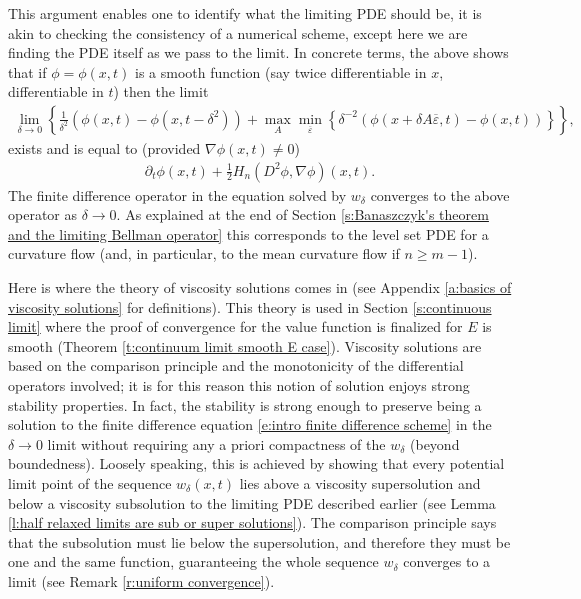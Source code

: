 \documentclass[reqno]{amsart}
\numberwithin{equation}{section}
\begin{document}
This argument enables one to identify what the limiting PDE should be, it is akin to checking the consistency of a numerical scheme, except here we are finding the PDE itself as we pass to the limit. In concrete terms, the above shows that if $\phi=\phi(x,t)$ is a smooth function (say twice differentiable in $x$, differentiable in $t$) then the limit
\begin{align*}
  \lim \limits_{\delta\to 0}\left \{ \tfrac{1}{\delta^2}(\phi(x,t)-\phi(x,t-\delta^2))+\max_A\min_{\overline \varepsilon}\left \{ \delta^{-2}(\phi(x+\delta A\overline\varepsilon,t)-\phi(x,t)) \right \} \right \},
\end{align*}
exists and is equal to (provided $\nabla \phi(x,t)\neq 0$)
\begin{align*}
  \partial_t \phi(x,t) + \tfrac{1}{2}H_n(D^2\phi,\nabla \phi)(x,t).
\end{align*}
The finite difference operator in the equation solved by $w_\delta$ converges to the above operator as $\delta \to 0$. As explained at the end of Section \ref{s:Banaszczyk's theorem and the limiting Bellman operator} this corresponds to the level set PDE for a curvature flow (and, in particular, to the mean curvature flow if $n\geq m-1$). 

Here is where the theory of viscosity solutions comes in (see Appendix \ref{a:basics of viscosity solutions} for definitions). This theory is used in Section \ref{s:continuous limit} where the proof of convergence for the value function is finalized for $E$ is smooth (Theorem \ref{t:continuum limit smooth E case}). Viscosity solutions are based on the comparison principle and the monotonicity of the differential operators involved; it is for this reason this notion of solution enjoys strong stability properties. In fact, the stability is strong enough to preserve being a solution to the finite difference equation \eqref{e:intro finite difference scheme} in the $\delta \to 0$ limit without requiring any a priori compactness of the $w_\delta$ (beyond boundedness). Loosely speaking, this is achieved by showing that every potential limit point of the sequence $w_\delta(x,t)$ lies above a viscosity supersolution and below a viscosity subsolution to the limiting PDE described earlier (see Lemma \ref{l:half relaxed limits are sub or super solutions}). The comparison principle says that the subsolution must lie below the supersolution, and therefore they must be one and the same function, guaranteeing the whole sequence $w_\delta$ converges to a limit (see Remark \ref{r:uniform convergence}).
\end{document}
